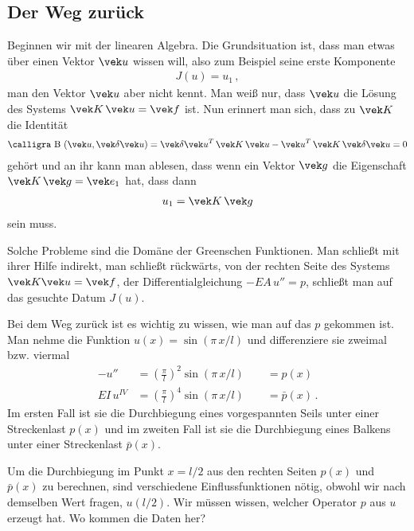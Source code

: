 {%
\textcolor{blau2}{\subsection{Der Weg zur\"{u}ck}}
Beginnen wir mit der linearen Algebra. Die Grundsituation ist, dass man etwas \"{u}ber einen Vektor $\vek u$ wissen will, also zum Beispiel seine erste Komponente
\begin{align}
J(u) = u_1\,,
\end{align}
man  den Vektor $\vek u$ aber nicht kennt. Man wei{\ss} nur, dass $\vek u$ die L\"{o}sung des Systems $\vek K\,\vek u = \vek f$ ist. Nun erinnert man sich, dass zu $\vek K$ die Identit\"{a}t
\begin{align}
\text{\normalfont\calligra B\,\,}(\vek u,\vek \delta \vek u) = \vek \delta \vek u^T\,\vek K\,\vek u - \vek u^T\,\vek K\,\vek \delta \vek u = 0
\end{align}
geh\"{o}rt und an ihr kann man ablesen, dass wenn ein Vektor $\vek g$ die Eigenschaft $\vek K\,\vek g = \vek e_1$ hat, dass dann
\begin{align}
u_1 = \vek K\,\vek g
\end{align}
sein muss.

Solche Probleme sind die Dom\"{a}ne der Greenschen Funktionen. Man schlie{\ss}t mit ihrer Hilfe indirekt, man schlie{\ss}t r\"{u}ckw\"{a}rts, von der rechten Seite des Systems $\vek K\vek u = \vek f$, der Differentialgleichung $- EA\,u'' = p$, schlie{\ss}t man auf das gesuchte Datum $J(u)$.

Bei dem Weg zur\"{u}ck ist es wichtig zu wissen, wie man auf das $p$ gekommen ist. Man nehme die Funktion $u(x) = \sin (\pi\,x/l)$ und differenziere sie zweimal bzw. viermal
\begin{align}
- u'' &= (\frac{\pi}{l})^2 \sin (\pi\,x/l)  \qquad = p(x)\,\\
EI\,u^{IV} &= (\frac{\pi}{l})^4 \sin (\pi\,x/l) \qquad =\bar{p}(x)\,.
\end{align}
Im ersten Fall ist sie die Durchbiegung eines vorgespannten Seils unter einer Streckenlast $p(x)$ und im zweiten Fall ist sie die Durchbiegung eines Balkens unter einer Streckenlast $\bar{p}(x)$.

Um die Durchbiegung im Punkt $x = l/2$ aus den rechten Seiten $p(x)$ und $\bar{p}(x)$
zu berechnen, sind verschiedene Einflussfunktionen n\"{o}tig, obwohl wir nach demselben Wert fragen, $u(l/2)$. Wir m\"{u}ssen wissen, welcher Operator $p$ aus $u$ erzeugt hat. Wo kommen die Daten her?

}
